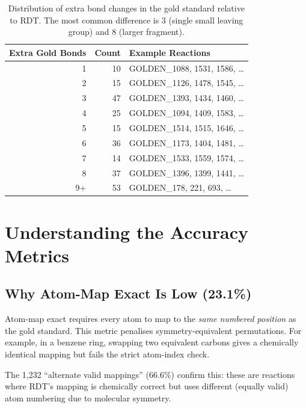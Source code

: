 \documentclass[11pt,a4paper]{article}
\begin{document}
\begin{table}[H]
\centering
\begin{tabular}{rrp{8cm}}
\toprule
\textbf{Extra Gold Bonds} & \textbf{Count} & \textbf{Example Reactions} \\
\midrule
1  & 10 & GOLDEN\_1088, 1531, 1586, \ldots \\
2  & 15 & GOLDEN\_1126, 1478, 1545, \ldots \\
3  & 47 & GOLDEN\_1393, 1434, 1460, \ldots \\
4  & 25 & GOLDEN\_1094, 1409, 1583, \ldots \\
5  & 15 & GOLDEN\_1514, 1515, 1646, \ldots \\
6  & 36 & GOLDEN\_1173, 1404, 1481, \ldots \\
7  & 14 & GOLDEN\_1533, 1559, 1574, \ldots \\
8  & 37 & GOLDEN\_1396, 1399, 1441, \ldots \\
9+ & 53 & GOLDEN\_178, 221, 693, \ldots \\
\bottomrule
\end{tabular}
\caption{Distribution of extra bond changes in the gold standard relative to RDT.
The most common difference is 3 (single small leaving group) and 8 (larger fragment).}
\label{tab:bond_diff}
\end{table}


\section{Understanding the Accuracy Metrics}

\subsection{Why Atom-Map Exact Is Low (23.1\%)}

Atom-map exact requires every atom to map to the \textit{same numbered position}
as the gold standard. This metric penalises symmetry-equivalent permutations.
For example, in a benzene ring, swapping two equivalent carbons gives a chemically
identical mapping but fails the strict atom-index check.

The 1,232 ``alternate valid mappings'' (66.6\%) confirm this: these are reactions
where RDT's mapping is chemically correct but uses different (equally valid) atom
numbering due to molecular symmetry.
\end{document}

